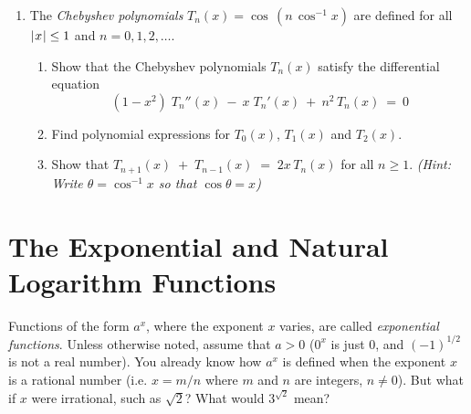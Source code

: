 {\begin{enumerate}[\bfseries 1.]
 \item The \emph{Chebyshev polynomials}
 $T_n(x) = \cos\,(n\,\cos^{-1} x)$ are defined for all $\lvert\mspace{1mu}x\mspace{1mu}\rvert \le 1$ and
 $n = 0, 1, 2, \ldots$.
 \begin{enumerate}[\bfseries (a)]
  \item Show that the Chebyshev polynomials $T_{n}(x)$ satisfy the differential
  equation
\[
(1 - x^2)\;T_{n}''(x) ~-~ x\;T_{n}'(x) ~+~ n^2\,T_{n}(x) ~=~ 0
\]
  \item Find polynomial expressions for $T_0(x)$, $T_1(x)$ and $T_2(x)$.
  \item Show that $T_{n+1}(x) \;+\; T_{n-1}(x) \;=\; 2x\,T_{n}(x)$ for all
  $n \ge 1$. \emph{(Hint: Write $\theta = \cos^{-1} x$ so that
  $\cos \theta = x$)}
 \end{enumerate}
\end{enumerate}}
\newpage
\section{The Exponential and Natural Logarithm Functions}
Functions of the form $a^x$, where the exponent $x$ varies, are called
\emph{exponential functions}.
Unless otherwise noted, assume that $a > 0$ ($0^x$ is just 0, and $(-1)^{1/2}$
is not a real number). You already know how $a^x$ is defined when the exponent
$x$ is a rational number (i.e. $x = m/n$ where $m$ and $n$ are integers,
$n \ne 0$). But what if $x$ were irrational, such as $\sqrt{2}$? What would
$3^{\sqrt{2}}$ mean?

